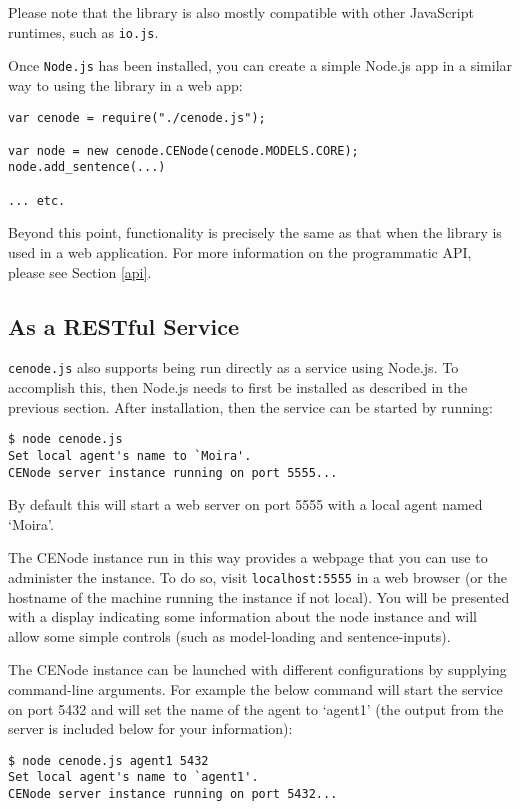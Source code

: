\documentclass{scrartcl}
\newcommand{\js}[1]{\texttt{#1}}
\begin{document}
Please note that the library is also mostly compatible with other JavaScript runtimes, such as \js{io.js}.

Once \js{Node.js} has been installed, you can create a simple Node.js app in a similar way to using the library in a web app:

\begin{verbatim}
var cenode = require("./cenode.js");

var node = new cenode.CENode(cenode.MODELS.CORE);
node.add_sentence(...)

... etc.
\end{verbatim}

Beyond this point, functionality is precisely the same as that when the library is used in a web application. For more information on the programmatic API, please see Section \ref{api}.


\subsection{As a RESTful Service}
\label{as_a_service}

\js{cenode.js} also supports being run directly as a service using Node.js. To accomplish this, then Node.js needs to first be installed as described in the previous section. After installation, then the service can be started by running:

\begin{verbatim}
$ node cenode.js
Set local agent's name to `Moira'.
CENode server instance running on port 5555...
\end{verbatim}

By default this will start a web server on port 5555 with a local agent named `Moira'.

The CENode instance run in this way provides a webpage that you can use to administer the instance. To do so, visit \js{localhost:5555} in a web browser (or the hostname of the machine running the instance if not local). You will be presented with a display indicating some information about the node instance and will allow some simple controls (such as model-loading and sentence-inputs).

The CENode instance can be launched with different configurations by supplying command-line arguments. For example the below command will start the service on port 5432 and will set the name of the agent to `agent1' (the output from the server is included below for your information):

\begin{verbatim}
$ node cenode.js agent1 5432
Set local agent's name to `agent1'.
CENode server instance running on port 5432...
\end{verbatim}
\end{document}

